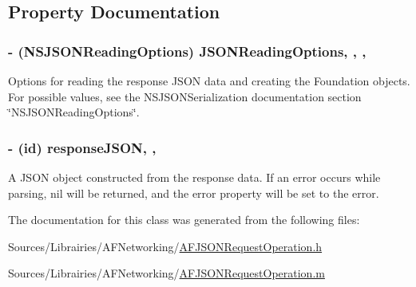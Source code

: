 \subsection{Property Documentation}
\hypertarget{interface_a_f_j_s_o_n_request_operation_a18f86ed904ccb70223a950ae5449a45b}{
\subsubsection[{J\-S\-O\-N\-Reading\-Options}]{\setlength{\rightskip}{0pt plus 5cm}-\/ (N\-S\-J\-S\-O\-N\-Reading\-Options) J\-S\-O\-N\-Reading\-Options\hspace{0.3cm}{\ttfamily [read]}, {\ttfamily [write]}, {\ttfamily [nonatomic]}, {\ttfamily [assign]}}}\label{interface_a_f_j_s_o_n_request_operation_a18f86ed904ccb70223a950ae5449a45b}
Options for reading the response J\-S\-O\-N data and creating the Foundation objects. For possible values, see the {\ttfamily N\-S\-J\-S\-O\-N\-Serialization} documentation section \char`\"{}\-N\-S\-J\-S\-O\-N\-Reading\-Options\char`\"{}. \hypertarget{interface_a_f_j_s_o_n_request_operation_a1bc9c9b08f780373ace7eb34b1ae8149}{
\subsubsection[{response\-J\-S\-O\-N}]{\setlength{\rightskip}{0pt plus 5cm}-\/ (id) response\-J\-S\-O\-N\hspace{0.3cm}{\ttfamily [read]}, {\ttfamily [nonatomic]}, {\ttfamily [strong]}}}\label{interface_a_f_j_s_o_n_request_operation_a1bc9c9b08f780373ace7eb34b1ae8149}
A J\-S\-O\-N object constructed from the response data. If an error occurs while parsing, {\ttfamily nil} will be returned, and the {\ttfamily error} property will be set to the error. 

The documentation for this class was generated from the following files\-:\begin{DoxyCompactItemize}
\item 
Sources/\-Librairies/\-A\-F\-Networking/\hyperlink{_a_f_j_s_o_n_request_operation_8h}{A\-F\-J\-S\-O\-N\-Request\-Operation.\-h}\item 
Sources/\-Librairies/\-A\-F\-Networking/\hyperlink{_a_f_j_s_o_n_request_operation_8m}{A\-F\-J\-S\-O\-N\-Request\-Operation.\-m}\end{DoxyCompactItemize}

